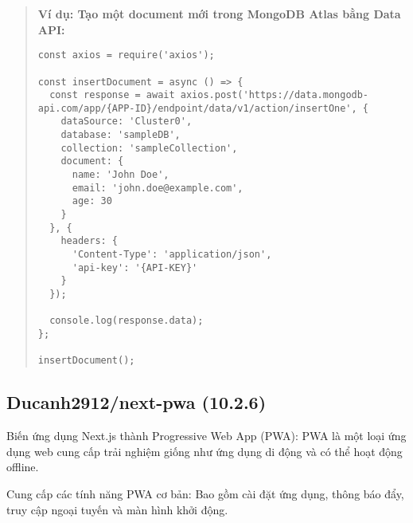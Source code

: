 \begin{quote}
\textbf{Ví dụ: Tạo một document mới trong MongoDB Atlas bằng Data API:}
\begin{lstlisting}
const axios = require('axios');

const insertDocument = async () => {
  const response = await axios.post('https://data.mongodb-api.com/app/{APP-ID}/endpoint/data/v1/action/insertOne', {
    dataSource: 'Cluster0',
    database: 'sampleDB',
    collection: 'sampleCollection',
    document: {
      name: 'John Doe',
      email: 'john.doe@example.com',
      age: 30
    }
  }, {
    headers: {
      'Content-Type': 'application/json',
      'api-key': '{API-KEY}'
    }
  });

  console.log(response.data);
};

insertDocument();
\end{lstlisting}
\end{quote}
\subsection{Ducanh2912/next-pwa (10.2.6)}

Biến ứng dụng Next.js thành Progressive Web App (PWA): PWA là một loại ứng dụng web cung cấp trải nghiệm giống như ứng dụng di động và có thể hoạt động offline.

Cung cấp các tính năng PWA cơ bản: Bao gồm cài đặt ứng dụng, thông báo đẩy, truy cập ngoại tuyến và màn hình khởi động.

